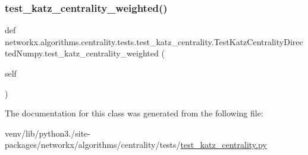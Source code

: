 \subsubsection{\texorpdfstring{test\+\_\+katz\+\_\+centrality\+\_\+weighted()}{test\_katz\_centrality\_weighted()}}
{\footnotesize\ttfamily def networkx.\+algorithms.\+centrality.\+tests.\+test\+\_\+katz\+\_\+centrality.\+Test\+Katz\+Centrality\+Directed\+Numpy.\+test\+\_\+katz\+\_\+centrality\+\_\+weighted (\begin{DoxyParamCaption}\item[{}]{self }\end{DoxyParamCaption})}



The documentation for this class was generated from the following file\+:\begin{DoxyCompactItemize}
\item 
venv/lib/python3./site-\/packages/networkx/algorithms/centrality/tests/\hyperlink{test__katz__centrality_8py}{test\+\_\+katz\+\_\+centrality.\+py}\end{DoxyCompactItemize}
